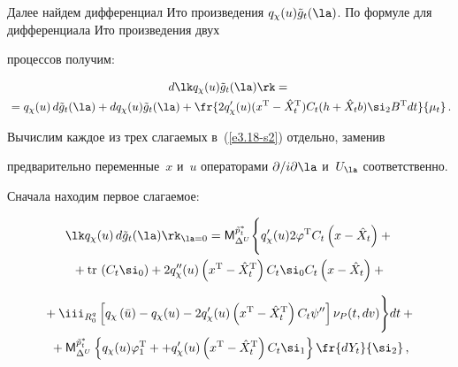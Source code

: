 Далее найдем дифференциал Ито произведения $q_\chi (u) \tilde

g_t(\la)$. По формуле для дифференциала Ито произведения двух

процессов  получим:

\begin{multline}

    d\lk q_\chi (u) \tilde g_t (\la)\rk = {}\\

    {}=q_\chi (u) \,d \tilde g_t

    (\la) + d q_\chi (u) \tilde g_t(\la)+ 

    \fr{2q_\chi' (u) (x^{\mathrm{T}}-\hat

    X_t^{\mathrm{T}}) C_t(h +\hat X_tb) \si_2 B^{\mathrm{T}} dt}{\mu_t}\,.

    \label{e3.18-s2}

    \end{multline}



Вычислим каждое из трех слагаемых в~(\ref{e3.18-s2}) отдельно, заменив

предварительно переменные~$x$ и~$u$ операторами $\partial/i\partial \la$ и~$U_\la$ соответственно.



Сначала находим первое слагаемое:

\begin{multline*}

\lk q_\chi (u)\, d \tilde g_t (\la)\rk_{\la=0} =

{\sf M}_{\Delta^U}^{\tilde{p}_t^*}\Bigg\{

    q_\chi' (u) 2\varphi^{\mathrm{T}} C_t\left(x -\hat X_t\right)+{}\\

  {}+

\mathrm{tr}\,  \left(C_t \si_0\right) +2q_\chi'' (u) 

\left(x^{\mathrm{T}}-\hat X_t^{\mathrm{T}}\right) C_t\si_0 C_t\left(x-\hat X_t\right)+{}

\end{multline*}



\noindent

\begin{multline}

{}+\iii_{R_0^q} \left[

    q_\chi\left(\bar u\right)- q_\chi (u)-2q_\chi '(u) 

    \left(x^{\mathrm{T}}-\hat X_t^{\mathrm{T}}\right) C_t \psi''\right]

     \nu_P (t,dv)

\Bigg\}dt +{}\\

{}+{\sf M}_{\Delta^U}^{\tilde{p}_t^*}

    \left\{ q_\chi (u) \varphi_1^{\mathrm{T}}+

+ q_\chi '(u)\left(x^{\mathrm{T}}-\hat X_t^{\mathrm{T}}\right)

    C_t\si_1\right\} \fr{dY_t}{\si_2}\,, \label{e3.19-s2}

    \end{multline}

